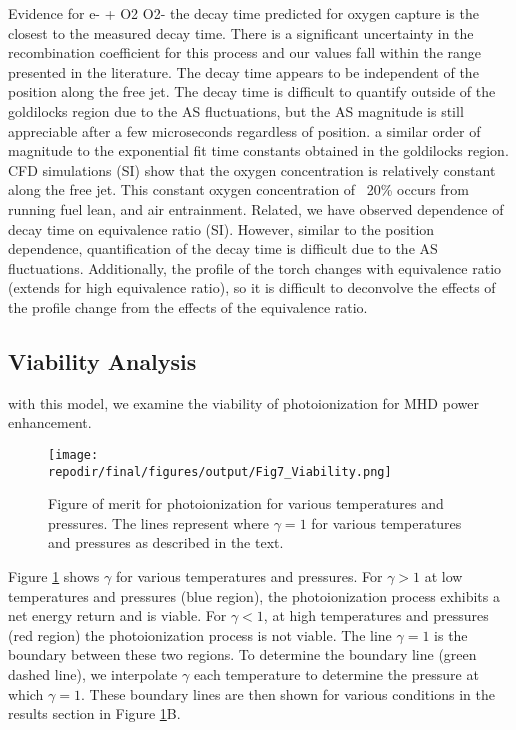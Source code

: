 \begin{outline}
    
\1 Evidence for e- + O2 \rightarrow O2-
    \2 the decay time predicted for oxygen capture is the closest to the measured decay time. There is a significant uncertainty in the recombination coefficient for this process and our values fall within the range presented in the literature. 
    \2 The decay time appears to be independent of the position along the free jet. The decay time is difficult to quantify outside of the goldilocks region due to the AS fluctuations, but the AS magnitude is still appreciable after a few microseconds regardless of position. a similar order of magnitude to the exponential fit time constants obtained in the goldilocks region. CFD simulations (SI) show that the oxygen concentration is relatively constant along the free jet. This constant oxygen concentration of ~20\% occurs from running fuel lean, and air entrainment. 
    \2 Related, we have observed dependence of decay time on equivalence ratio (SI). However, similar to the position dependence, quantification of the decay time is difficult due to the AS fluctuations. Additionally, the profile of the torch changes with equivalence ratio (extends for high equivalence ratio), so it is difficult to deconvolve the effects of the profile change from the effects of the equivalence ratio.
\end{outline}



\subsection{Viability Analysis}

with this model, we examine the viability of photoionization for MHD power enhancement. 


\begin{figure}[h]
    \centering
    \texttt{[image: \\repodir/final/figures/output/Fig7\_Viability.png]} 
    \caption{Figure of merit for photoionization for various temperatures and pressures. The lines represent where $\gamma = 1$ for various temperatures and pressures as described in the text.}   
    \label{fig:viability_gamma}
\end{figure}

Figure \ref{fig:viability_gamma} shows $\gamma$ for various temperatures and pressures.  For $\gamma > 1$ at low temperatures and pressures (blue region), the photoionization process exhibits a net energy return and is viable. For $\gamma < 1$, at high temperatures and pressures (red region) the photoionization process is not viable. The line $\gamma = 1$ is the boundary between these two regions. To determine the boundary line (green dashed  line), we interpolate $\gamma$ each temperature to determine the pressure at which $\gamma = 1$. These boundary lines are then shown for various conditions in the results section in Figure \ref{fig:viability_gamma}B.

